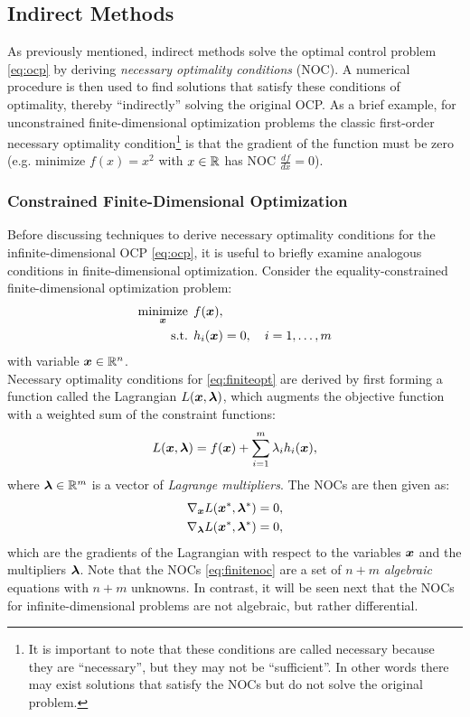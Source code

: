 \subsection{Indirect Methods}
As previously mentioned, indirect methods solve the optimal control problem \eqref{eq:ocp} by deriving \textit{necessary optimality conditions} (NOC). A numerical procedure is then used to find solutions that satisfy these conditions of optimality, thereby ``indirectly'' solving the original OCP. As a brief example, for unconstrained finite-dimensional optimization problems the classic first-order necessary optimality condition\footnote{It is important to note that these conditions are called necessary because they are ``necessary'', but they may not be ``sufficient''. In other words there may exist solutions that satisfy the NOCs but do not solve the original problem.} is that the gradient of the function must be zero (e.g. minimize $f(x) = x^2$ with $x \in \mathbb{R}$ has NOC $\frac{df}{dx} = 0$).

\subsubsection{Constrained Finite-Dimensional Optimization} \label{subsubsec:constfiniteopt}
Before discussing techniques to derive necessary optimality conditions for the infinite-dimensional OCP \eqref{eq:ocp}, it is useful to briefly examine analogous conditions in finite-dimensional optimization\cite{BoydVandenberghe2004}. Consider the equality-constrained finite-dimensional optimization problem:
\begin{equation} \label{eq:finiteopt}
\begin{split}
\underset{\bm{x}}{\text{minimize}} \:\: &f(\bm{x}), \\
\text{s.t.} \:\:&h_i(\bm{x}) = 0, \quad i = 1,\dots,m \\
\end{split}
\end{equation}
with variable $\bm{x} \in \mathbb{R}^n$. \\

Necessary optimality conditions for \eqref{eq:finiteopt} are derived by first forming a function called the Lagrangian $L(\bm{x}, \bm{\lambda})$, which augments the objective function with a weighted sum of the constraint functions:
\begin{equation} \label{eq:lagrangian}
    L(\bm{x},\bm{\lambda}) = f(\bm{x}) + \sum_{i=1}^m \lambda_i h_i(\bm{x}),
\end{equation}
where $\bm{\lambda} \in \mathbb{R}^m$ is a vector of \textit{Lagrange multipliers}. The NOCs are then given as:
\begin{equation} \label{eq:finitenoc}
\begin{split}
\nabla_{\bm{x}} L(\bm{x}^*,\bm{\lambda}^*) &= 0, \\
\nabla_{\bm{\lambda}} L(\bm{x}^*,\bm{\lambda}^*) &= 0,
\end{split}
\end{equation}
which are the gradients of the Lagrangian with respect to the variables $\bm{x}$ and the multipliers $\bm{\lambda}$. Note that the NOCs \eqref{eq:finitenoc} are a set of $n+m$ \textit{algebraic} equations with $n+m$ unknowns. In contrast, it will be seen next that the NOCs for infinite-dimensional problems are not algebraic, but rather differential.

